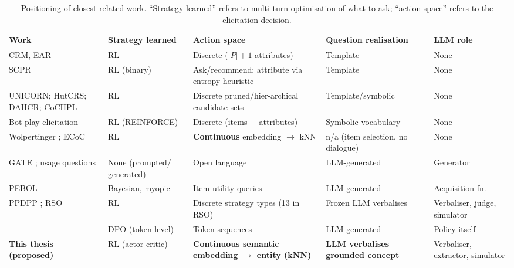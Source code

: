 \begin{table}[ht]
\centering
\caption{Positioning of closest related work. ``Strategy learned'' refers to multi-turn optimisation of what to ask; ``action space'' refers to the elicitation decision.}
\label{tab:positioning}
\small
\begin{tabular}{p{3.4cm}p{2.5cm}p{3.2cm}p{2.6cm}p{2.2cm}}
\toprule
\textbf{Work} & \textbf{Strategy learned} & \textbf{Action space} & \textbf{Question realisation} & \textbf{LLM role} \\
\midrule
CRM, EAR \citep{sun2018conversational, lei2020estimation} & RL & Discrete ($|P|{+}1$ attributes) & Template & None \\
SCPR \citep{lei2020interactive} & RL (binary) & Ask/recommend; attribute via entropy heuristic & Template & None \\
UNICORN; HutCRS; DAHCR; CoCHPL \citep{deng2021unified, qian2023hutcrs, zhao2023hierarchical, fan2024chain} & RL & Discrete pruned/hier-archical candidate sets & Template/symbolic & None \\
Bot-play elicitation \citep{makarova2024learning} & RL (REINFORCE) & Discrete (items + attributes) & Symbolic vocabulary & None \\
Wolpertinger \citep{dulacarnold2015deep}; ECoC \citep{wang2024efficient} & RL & \textbf{Continuous} embedding $\to$ kNN & n/a (item selection, no dialogue) & None \\
GATE \citep{li2023eliciting}; usage questions \citep{kostric2024generating} & None (prompted/ generated) & Open language & LLM-generated & Generator \\
PEBOL \citep{austin2024bayesian} & Bayesian, myopic & Item-utility queries & LLM-generated & Acquisition fn. \\
PPDPP \citep{deng2023plug}; RSO \citep{zhao2025reinforced} & RL & Discrete strategy types (13 in RSO) & Frozen LLM verbalises & Verbaliser, judge, simulator \\
\citet{zhang2025modeling} & DPO (token-level) & Token sequences & LLM-generated & Policy itself \\
\midrule
\textbf{This thesis (proposed)} & RL (actor-critic) & \textbf{Continuous semantic embedding $\to$ entity (kNN)} & \textbf{LLM verbalises grounded concept} & Verbaliser, extractor, simulator \\
\bottomrule
\end{tabular}
\end{table}

